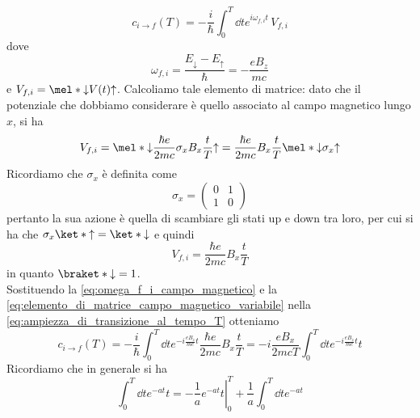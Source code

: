 \begin{soluzione}
   \begin{equation}
      c_{i \to f}(T)
      =-\frac{i}{\hbar} \int_{0}^{T} \dd{t} e^{i \omega_{f,i} t} \, V_{f,i}
      \label{eq:ampiezza_di_transizione_al_tempo_T}
   \end{equation}
   dove
   \begin{equation}
      \omega_{f,i}
      =\frac{E_{\downarrow} - E_{\uparrow}}{\hbar}
      =-\frac{e B_z}{m c}
      \label{eq:omega_f_i_campo_magnetico}
   \end{equation}
   e $V_{f,i}=\mel*{\downarrow}{V(t)}{\uparrow}$. Calcoliamo tale elemento di matrice: dato che il potenziale che dobbiamo considerare è quello associato al campo magnetico lungo $x$, si ha
   \begin{equation*}
      V_{f,i}
      =\mel*{\downarrow}{\frac{\hbar e}{2 m c} \sigma_x B_x \frac{t}{T}}{\uparrow}
      =\frac{\hbar e}{2 m c} B_x \frac{t}{T}\mel*{\downarrow}{\sigma_x}{\uparrow}
   \end{equation*}
   Ricordiamo che $\sigma_x$ è definita come
   \begin{equation*}
      \sigma_x=
      \begin{pmatrix}
         0 & 1 \\
         1 & 0
      \end{pmatrix}
   \end{equation*}
   pertanto la sua azione è quella di scambiare gli stati up e down tra loro, per cui si ha che $\sigma_x \ket*{\uparrow}=\ket*{\downarrow}$ e quindi
   \begin{equation}
      V_{f,i}
      =\frac{\hbar e}{2 m c} B_x \frac{t}{T}
      \label{eq:elemento_di_matrice_campo_magnetico_variabile}
   \end{equation}
   in quanto $\braket*{\downarrow}=1$.\\
   Sostituendo la \eqref{eq:omega_f_i_campo_magnetico} e la \eqref{eq:elemento_di_matrice_campo_magnetico_variabile} nella \eqref{eq:ampiezza_di_transizione_al_tempo_T} otteniamo
   \begin{equation*}
      c_{i \to f}(T)
      =-\frac{i}{\hbar} \int_{0}^{T} \dd{t} e^{-i \frac{e B_z}{m c} t } \frac{\hbar e}{2 m c} B_x \frac{t}{T}
      =-i \frac{e B_x}{2 m c T} \int_{0}^{T} \dd{t} e^{-i \frac{e B_z}{m c} t } t
   \end{equation*}
   Ricordiamo che in generale si ha
   \begin{equation*}
      \int_{0}^{T} \dd{t} e^{- a t} t
      =\left. -\frac{1}{a} e^{-a t} t \right|_{0}^{T} + \frac{1}{a} \int_{0}^{T} \dd{t} e^{-a t}

\end{equation*}
\end{soluzione}
